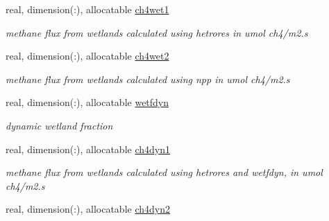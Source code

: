 \begin{DoxyCompactItemize}
\item 
\hypertarget{structctem__statevars_1_1veg__gat_ac99ca0240b54241d3045dbfbd46e83c9}{}real, dimension(\+:), allocatable \hyperlink{structctem__statevars_1_1veg__gat_ac99ca0240b54241d3045dbfbd46e83c9}{ch4wet1}\label{structctem__statevars_1_1veg__gat_ac99ca0240b54241d3045dbfbd46e83c9}

\begin{DoxyCompactList}\small\item\em methane flux from wetlands calculated using hetrores in umol ch4/m2.\+s \end{DoxyCompactList}\item 
\hypertarget{structctem__statevars_1_1veg__gat_a5e88723e69339ab0ce00db365184e9c4}{}real, dimension(\+:), allocatable \hyperlink{structctem__statevars_1_1veg__gat_a5e88723e69339ab0ce00db365184e9c4}{ch4wet2}\label{structctem__statevars_1_1veg__gat_a5e88723e69339ab0ce00db365184e9c4}

\begin{DoxyCompactList}\small\item\em methane flux from wetlands calculated using npp in umol ch4/m2.\+s \end{DoxyCompactList}\item 
\hypertarget{structctem__statevars_1_1veg__gat_aec6ed9e74a5bc50612a7c6507889b9fc}{}real, dimension(\+:), allocatable \hyperlink{structctem__statevars_1_1veg__gat_aec6ed9e74a5bc50612a7c6507889b9fc}{wetfdyn}\label{structctem__statevars_1_1veg__gat_aec6ed9e74a5bc50612a7c6507889b9fc}

\begin{DoxyCompactList}\small\item\em dynamic wetland fraction \end{DoxyCompactList}\item 
\hypertarget{structctem__statevars_1_1veg__gat_a9ec9833a16dbbb2b7465272da6924d9b}{}real, dimension(\+:), allocatable \hyperlink{structctem__statevars_1_1veg__gat_a9ec9833a16dbbb2b7465272da6924d9b}{ch4dyn1}\label{structctem__statevars_1_1veg__gat_a9ec9833a16dbbb2b7465272da6924d9b}

\begin{DoxyCompactList}\small\item\em methane flux from wetlands calculated using hetrores and wetfdyn, in umol ch4/m2.\+s \end{DoxyCompactList}\item 
\hypertarget{structctem__statevars_1_1veg__gat_a79a2527c12e709fb46b03a7b167511c9}{}real, dimension(\+:), allocatable \hyperlink{structctem__statevars_1_1veg__gat_a79a2527c12e709fb46b03a7b167511c9}{ch4dyn2}\label{structctem__statevars_1_1veg__gat_a79a2527c12e709fb46b03a7b167511c9}


\end{DoxyCompactItemize}
